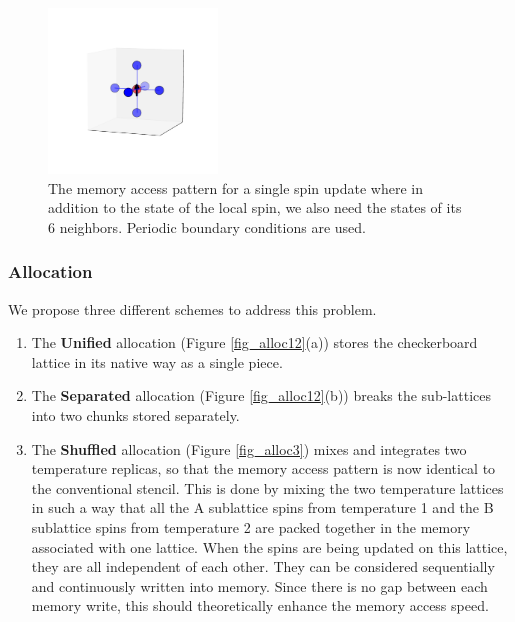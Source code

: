 \begin{figure}[ht]
  \centering
  \includegraphics[width=0.4\textwidth] {img/near.pdf}
  \caption{The memory access pattern for a single spin update where in
    addition to the state of the local spin, we also need the states
    of its 6 neighbors. Periodic boundary conditions are used.}
\label{fig_stencil}
\end{figure}



\subsubsection{Allocation}


We propose three different schemes to address this problem.
\begin{enumerate}
\item The {\bf Unified} allocation (Figure \ref {fig_alloc12}(a))
  stores the checkerboard lattice in its native way as a single piece.
\item The {\bf Separated} allocation (Figure \ref{fig_alloc12}(b))
  breaks the sub-lattices into two chunks stored separately.
\item The {\bf Shuffled} allocation \cite{2008CoPhC.178..208B} (Figure
  \ref{fig_alloc3}) mixes and integrates two temperature replicas,
  so that the memory access pattern is now identical to the
  conventional stencil.  This is done by mixing the two temperature
  lattices in such a way that all the A sublattice spins from
  temperature 1 and the B sublattice spins from temperature 2 are
  packed together in the memory associated with one lattice. When the
  spins are being updated on this lattice, they are all independent
  of each other. They can be considered sequentially and
  continuously written into memory. Since there is no gap between each
  memory write, this should theoretically enhance the memory access
  speed.
\end{enumerate}

